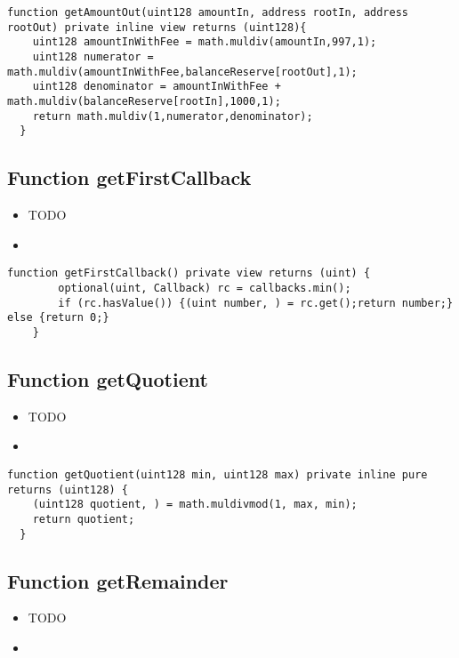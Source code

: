 \begin{lstlisting}[firstnumber=157]
  function getAmountOut(uint128 amountIn, address rootIn, address rootOut) private inline view returns (uint128){
    uint128 amountInWithFee = math.muldiv(amountIn,997,1);
    uint128 numerator = math.muldiv(amountInWithFee,balanceReserve[rootOut],1);
    uint128 denominator = amountInWithFee + math.muldiv(balanceReserve[rootIn],1000,1);
    return math.muldiv(1,numerator,denominator);
  }
\end{lstlisting}

\subsection{Function getFirstCallback}

\begin{itemize}
\item TODO
\item \issueInternal
\end{itemize}

\begin{lstlisting}[firstnumber=242]
  function getFirstCallback() private view returns (uint) {
		optional(uint, Callback) rc = callbacks.min();
		if (rc.hasValue()) {(uint number, ) = rc.get();return number;} else {return 0;}
	}
\end{lstlisting}

\subsection{Function getQuotient}

\begin{itemize}
\item TODO
\item \issueInternal
\end{itemize}

\begin{lstlisting}[firstnumber=165]
  function getQuotient(uint128 min, uint128 max) private inline pure returns (uint128) {
    (uint128 quotient, ) = math.muldivmod(1, max, min);
    return quotient;
  }
\end{lstlisting}

\subsection{Function getRemainder}

\begin{itemize}
\item TODO
\item \issueInternal
\end{itemize}

